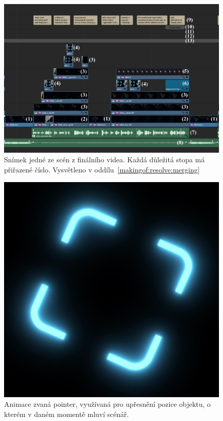 \documentclass[12pt,a4paper,titlepage]{article}
\begin{document}
\begin{figure}[ht]
	\centering
	\includegraphics[width=1\textwidth]{timeline_annotated.eps}
	\caption{Snímek jedné ze scén z finálního videa. Každá důležitá stopa má přiřazené číslo. Vysvětleno v oddílu~\ref{makingof:resolve:merging}}\label{img:timeline}
\end{figure}

\begin{figure}[ht]
	\centering
	\includegraphics[width=.5\textwidth]{pointer.eps}
	\caption{Animace zvaná pointer, využívaná pro upřesnění pozice objektu, o kterém v daném momentě mluví scénář.}\label{img:pointer}
\end{figure}
\end{document}
